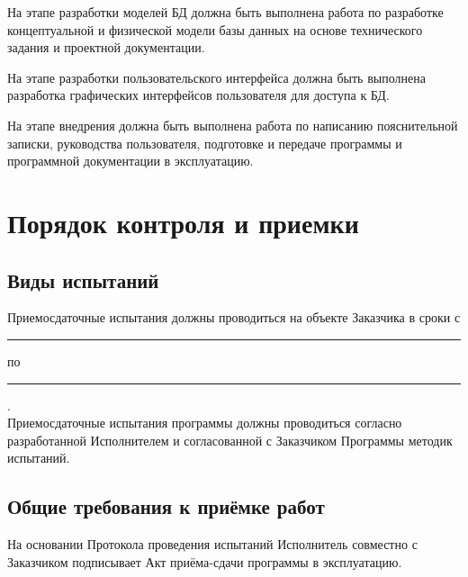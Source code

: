    На этапе разработки моделей БД должна быть выполнена работа по разработке концептуальной и физической модели базы данных на основе технического задания и проектной документации.

    На этапе разработки пользовательского интерфейса должна быть выполнена разработка графических интерфейсов пользователя для доступа к БД.

    На этапе внедрения должна быть выполнена работа по написанию пояснительной записки, руководства пользователя, подготовке и передаче программы и программной документации в эксплуатацию.
\section{Порядок контроля и приемки}
  \subsection{Виды испытаний}
    Приемосдаточные испытания должны проводиться на объекте Заказчика в сроки с \rule{3cm}{.1pt} по \rule{3cm}{.1pt}  .\\
    Приемосдаточные испытания программы должны проводиться согласно разработанной Исполнителем и согласованной с Заказчиком Программы методик испытаний.
  \subsection{Общие требования к приёмке работ}
    На основании Протокола проведения испытаний Исполнитель совместно с Заказчиком подписывает Акт приёма-сдачи программы в эксплуатацию.
\endinput
